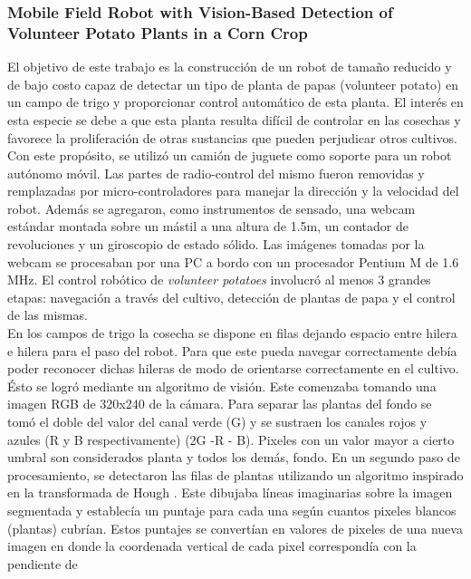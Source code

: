 	\subsubsection{\label{volunteer}Mobile Field Robot with Vision-Based Detection of Volunteer Potato Plants in a Corn Crop \cite{potato}}
	El objetivo de este trabajo es la construcci\'on de un robot de 
	tama\~no reducido y de bajo costo capaz de detectar un tipo de 
	planta de papas (volunteer potato) en un campo de trigo y proporcionar control autom\'atico de esta planta. El inter\'es en 
	esta especie se debe a que esta planta resulta dif\'icil de controlar en las cosechas y favorece la 
	proliferaci\'on de otras sustancias que pueden perjudicar otros 
	cultivos. Con este prop\'osito, se utiliz\'o un cami\'on de juguete como 
	soporte para un robot aut\'onomo m\'ovil. Las partes de 
	radio-control del mismo fueron 
	removidas y remplazadas por micro-controladores para manejar la 
	direcci\'on y la velocidad del robot. Adem\'as se agregaron, como instrumentos de 
	sensado, una webcam est\'andar montada sobre un m\'astil a 
	una altura de 1.5m, un contador de revoluciones y un giroscopio de 
	estado s\'olido. Las im\'agenes tomadas por la webcam se procesaban 
	por una PC a bordo con un procesador Pentium M de 1.6 MHz. El control rob\'otico de \emph{volunteer potatoes} 
	involucr\'o al menos 3 grandes etapas: navegaci\'on a trav\'es del cultivo, detecci\'on 
	de plantas de papa y el control de las mismas.\\
	\indent En los campos de trigo la cosecha se dispone en filas 
	dejando espacio entre hilera e hilera para el paso del robot. Para 
	que este pueda navegar correctamente deb\'ia poder reconocer dichas 
	hileras de modo de orientarse correctamente en el cultivo. \'Esto se 
	logr\'o mediante un algoritmo de visi\'on. Este comenzaba 
	tomando una imagen RGB de 320x240 de la c\'amara. Para separar las 
	plantas del fondo se tom\'o el doble del valor del canal verde (G)  y se 
	sustraen los canales rojos y azules (R y B respectivamente) (2G -R - B). Pixeles con un 
	valor mayor a cierto umbral son considerados planta y todos los 
	dem\'as, fondo. En un segundo paso de procesamiento, se detectaron las 
	filas de plantas utilizando un algoritmo inspirado en la 
	transformada de Hough \cite{hough62}. Este dibujaba l\'ineas imaginarias sobre la 
	imagen segmentada y establec\'ia un puntaje para cada una seg\'un 
	cuantos pixeles blancos (plantas) cubr\'ian. Estos puntajes se 
	convert\'ian en valores de pixeles de una nueva imagen en donde la 
	coordenada vertical de cada pixel correspond\'ia con la pendiente de 
